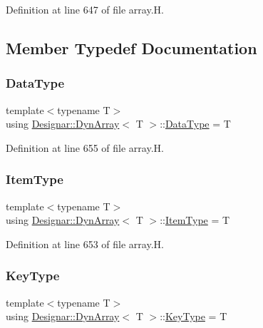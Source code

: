 Definition at line 647 of file array.\+H.



\subsection{Member Typedef Documentation}
\mbox{\label{class_designar_1_1_dyn_array_aa683f9cc296f4597784541837e234d83}} 
\subsubsection{\texorpdfstring{Data\+Type}{DataType}}
{\footnotesize\ttfamily template$<$typename T$>$ \\
using \hyperlink{class_designar_1_1_dyn_array}{Designar\+::\+Dyn\+Array}$<$ T $>$\+::\hyperlink{class_designar_1_1_fixed_array_a3e37931b909b840cb7a40fc73f12bcf5}{Data\+Type} =  T}



Definition at line 655 of file array.\+H.

\mbox{\label{class_designar_1_1_dyn_array_af4ff8919b3ae0778aa749130ee0e35f7}} 
\subsubsection{\texorpdfstring{Item\+Type}{ItemType}}
{\footnotesize\ttfamily template$<$typename T$>$ \\
using \hyperlink{class_designar_1_1_dyn_array}{Designar\+::\+Dyn\+Array}$<$ T $>$\+::\hyperlink{class_designar_1_1_fixed_array_abfeb4e683cee75ae782ad20294c4c808}{Item\+Type} =  T}



Definition at line 653 of file array.\+H.

\mbox{\label{class_designar_1_1_dyn_array_a80080a85ac9ccbe95c17bc0c665e70b4}} 
\subsubsection{\texorpdfstring{Key\+Type}{KeyType}}
{\footnotesize\ttfamily template$<$typename T$>$ \\
using \hyperlink{class_designar_1_1_dyn_array}{Designar\+::\+Dyn\+Array}$<$ T $>$\+::\hyperlink{class_designar_1_1_fixed_array_a3a725cf21783340b8aca29dd1db0acf0}{Key\+Type} =  T}



